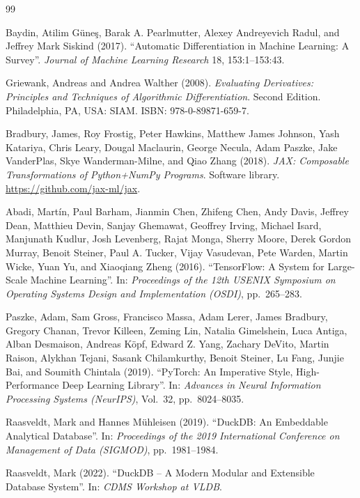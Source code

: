 \documentclass[12pt]{report}
\begin{document}
\begin{thebibliography}{99}

Baydin, Atilim G{\"u}ne{\c{s}}, Barak A. Pearlmutter, Alexey Andreyevich Radul, and Jeffrey Mark Siskind (2017).
``Automatic Differentiation in Machine Learning: A Survey''.
\textit{Journal of Machine Learning Research} 18,
153:1--153:43.

Griewank, Andreas and Andrea Walther (2008).
\textit{Evaluating Derivatives: Principles and Techniques of Algorithmic Differentiation}.
Second Edition.
Philadelphia, PA, USA: SIAM.
ISBN: 978-0-89871-659-7.

Bradbury, James, Roy Frostig, Peter Hawkins,
Matthew James Johnson, Yash Katariya, Chris Leary,
Dougal Maclaurin, George Necula, Adam Paszke,
Jake VanderPlas, Skye Wanderman-Milne, and Qiao Zhang (2018).
\textit{JAX: Composable Transformations of Python+NumPy Programs}.
Software library.
\url{https://github.com/jax-ml/jax}.

Abadi, Mart\'in, Paul Barham, Jianmin Chen, Zhifeng Chen, Andy Davis,
Jeffrey Dean, Matthieu Devin, Sanjay Ghemawat, Geoffrey Irving,
Michael Isard, Manjunath Kudlur, Josh Levenberg, Rajat Monga,
Sherry Moore, Derek Gordon Murray, Benoit Steiner, Paul A. Tucker,
Vijay Vasudevan, Pete Warden, Martin Wicke, Yuan Yu, and Xiaoqiang Zheng (2016).
``TensorFlow: A System for Large-Scale Machine Learning''.
In: \textit{Proceedings of the 12th USENIX Symposium on Operating Systems Design and Implementation (OSDI)},
pp.~265--283.

Paszke, Adam, Sam Gross, Francisco Massa, Adam Lerer,
James Bradbury, Gregory Chanan, Trevor Killeen,
Zeming Lin, Natalia Gimelshein, Luca Antiga,
Alban Desmaison, Andreas K{\"o}pf, Edward Z. Yang,
Zachary DeVito, Martin Raison, Alykhan Tejani,
Sasank Chilamkurthy, Benoit Steiner, Lu Fang,
Junjie Bai, and Soumith Chintala (2019).
``PyTorch: An Imperative Style, High-Performance Deep Learning Library''.
In: \textit{Advances in Neural Information Processing Systems (NeurIPS)},
Vol.~32, pp.~8024--8035.


Raasveldt, Mark and Hannes M{\"u}hleisen (2019).
``DuckDB: An Embeddable Analytical Database''.
In: \textit{Proceedings of the 2019 International Conference on Management of Data (SIGMOD)},
pp.~1981--1984.

Raasveldt, Mark (2022).
``DuckDB -- A Modern Modular and Extensible Database System''.
In: \textit{CDMS Workshop at VLDB}.



\end{thebibliography}
\end{document}
